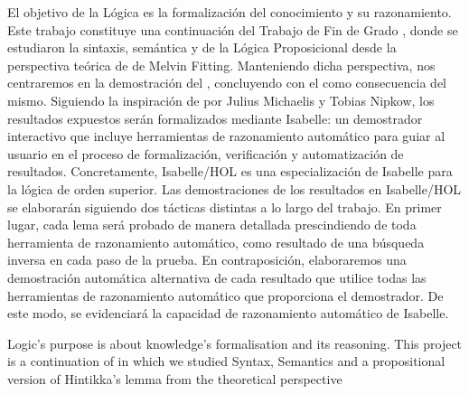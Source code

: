 %
\begin{isabellebody}%
%
%
\isadelimtheory
%
\endisadelimtheory
%
\isatagtheory
%
\endisatagtheory
{\isafoldtheory}%
%
\isadelimtheory
%
\endisadelimtheory
%
\begin{isamarkuptext}%
El objetivo de la Lógica es la formalización del conocimiento y su
razonamiento. Este trabajo constituye una continuación del Trabajo de Fin de
Grado  , donde se estudiaron
la sintaxis, semántica y  de la Lógica Proposicional
desde la perspectiva teórica de  
 de Melvin Fitting. Manteniendo dicha perspectiva, nos centraremos en la 
demostración del , concluyendo con 
el  como consecuencia del mismo. Siguiendo la 
inspiración de   por Julius Michaelis y Tobias 
Nipkow, los resultados expuestos serán formalizados mediante Isabelle: un demostrador 
interactivo que incluye herramientas de razonamiento automático para guiar al usuario 
en el proceso de formalización, verificación y automatización de resultados. 
Concretamente, Isabelle/HOL es una especialización de Isabelle para la lógica de orden 
superior. Las demostraciones de los resultados en Isabelle/HOL se elaborarán siguiendo 
dos tácticas distintas a lo largo del trabajo. En primer lugar, cada lema será probado 
de manera detallada prescindiendo de toda herramienta de razonamiento automático, como 
resultado de una búsqueda inversa en cada paso de la prueba. En contraposición, 
elaboraremos una demostración automática alternativa de cada resultado que utilice todas 
las herramientas de razonamiento automático que proporciona el demostrador. De este modo, 
se evidenciará la capacidad de razonamiento automático de Isabelle.%
\end{isamarkuptext}\isamarkuptrue%
%
\begin{isamarkuptext}%
Logic’s purpose is about knowledge’s formalisation and its 
reasoning. This project is a continuation of   in which we studied Syntax, Semantics and
a propositional version of Hintikka's lemma from the theoretical perspective 

\end{isamarkuptext}
\end{isabellebody}
